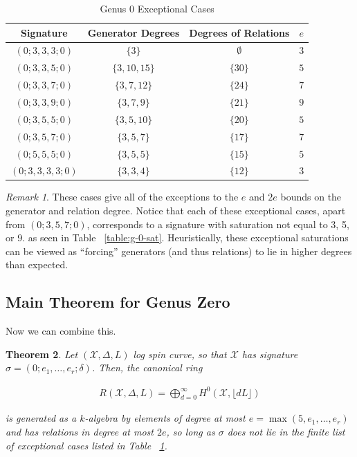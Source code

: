\documentclass{amsart}
\theoremstyle{plain}
\newtheorem{thm}{Theorem}[section]
\theoremstyle{definition}
\theoremstyle{remark}
\newtheorem{rem}[thm]{Remark}
\numberwithin{equation}{section}
\newcommand\ssec{\subsection}
\newcommand \sx{\mathscr X}
\newcommand{\halfcan}{L}
\begin{document}
\begin{longtable}
	{| c || c | c | c |}
	\caption{Genus 0 Exceptional Cases}
	\label{table:g-0-exceptional}
	
	\tabularnewline
	
	\hline
	Signature & Generator Degrees & Degrees of Relations & $e$ \\
	\hline
	\hline

	$(0; 3, 3, 3; 0)$ & $\{3\}$ & $\emptyset$ & $3$ \\	\hline

	$(0; 3, 3, 5; 0)$ & $\{3, 10, 15\}$ & $\{30\}$ & $5$ \\	\hline
	
	$(0; 3, 3, 7; 0)$ & $\{3, 7, 12\}$ & $\{24\}$ & $7$ \\	\hline
	
	$(0; 3, 3, 9; 0)$ & $\{3, 7, 9\}$ & $\{21\}$ & $9$ \\	\hline
	
	$(0; 3, 5, 5; 0)$ & $\{3, 5, 10\}$ & $\{20\}$ & $5$ \\	\hline
	
	$(0; 3, 5, 7; 0)$ & $\{3, 5, 7\}$ & $\{17\}$ & $7$ \\	\hline
	
	$(0; 5, 5, 5; 0)$ & $\{3, 5, 5\}$ & $\{15\}$ & $5$ \\	\hline
	
	$(0; 3, 3, 3, 3; 0)$ & $\{3, 3, 4\}$ & $\{12\}$ & $3$ \\	\hline
\end{longtable}

\begin{rem}
These cases give all of the exceptions to the $e$ and $2e$ bounds on
the generator and relation degree. Notice that each of these
exceptional cases, apart from $(0; 3, 5, 7; 0)$, corresponds to a
signature with saturation not equal to
3, 5, or 9. as seen in Table ~\ref{table:g-0-sat}. Heuristically,
these exceptional saturations can be viewed as ``forcing'' generators
(and thus relations) to lie in higher degrees than expected.
\end{rem}

\ssec{Main Theorem for Genus Zero}
\label{ssec:g-0-main}
Now we can combine this.

\begin{thm}
\label{thm:g-0-main}
Let $(\sx, \Delta, \halfcan)$ log spin curve,
so that $\sx$ has signature $\sigma = (0; e_1, \ldots, e_r; \delta)$.
Then, the canonical ring

\begin{align*}
	R(\sx, \Delta, \halfcan) = \bigoplus_{d = 0}^\infty H^0(\sx, \lfloor d L \rfloor)
\end{align*}

\noindent
is generated as a $k$-algebra by elements of degree at most $e =
\max(5, e_1, \ldots, e_r)$ and has relations in degree at most $2e$,
so long as $\sigma$ does not lie in the finite list of exceptional
cases listed in Table ~\ref{table:g-0-exceptional}.
\end{thm}
\end{document}
